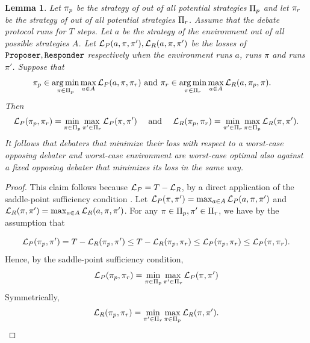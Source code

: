 \documentclass[11pt,letterpaper]{article}
\newtheorem{lemma}[theorem]{Lemma}
\theoremstyle{definition}
\theoremstyle{plain}
\DeclareMathOperator*{\argmin}{arg\,min}
\begin{document}
\begin{lemma}\label{lem:equilibrium}
    Let $\pi_{p}$ be the strategy of \dt out of all potential strategies $\Pi_{p}$ and let $\pi_{r}$ be the strategy of \df out of all potential strategies $\Pi_{r}$. Assume that the debate protocol runs for $T$ steps. Let $a$ be the strategy of the environment out of all possible strategies $A$. 
    Let ${{\mathcal L}_P}(a, \pi,\pi'), {{\mathcal L}_R}(a,\pi,\pi')$ be the losses of $\texttt{Proposer},\texttt{Responder}$ respectively when the environment runs $a$, \dt runs $\pi$ and \df runs $\pi'$. 
    Suppose that 
    \begin{align*}
            &\pi_\ct \in \argmin_{\pi \in \Pi_\ct} \max_{a \in A} \tLo(a,\pi,\pi_\cf)\text{     and }
    \pi_\cf \in \argmin_{\pi \in \Pi_\cf} \max_{a \in A} \fLo(a,\pi_\ct,\pi).
    \end{align*}
    Then 
    \[
   {{\mathcal L}_P}(\pi_{p}, \pi_{r})
    = \min_{\pi \in \Pi_{p}}\max_{\pi'\in \Pi_{r}}{{\mathcal L}_P}(\pi,\pi')
\quad \text{ and }\quad
{{\mathcal L}_R}(\pi_{p}, \pi_{r})
 =    \min_{\pi' \in \Pi_{r}}\max_{\pi\in \Pi_{p}}{{\mathcal L}_R}(\pi,\pi').
    \]
    It follows that debaters that minimize their loss with respect to a worst-case opposing debater and worst-case environment are worst-case optimal also against a fixed opposing debater that minimizes its loss in the same way. 
\end{lemma}
\begin{proof}
    This claim follows because ${{\mathcal L}_P} = T-{{\mathcal L}_R}$, by a direct application of the saddle-point 
sufficiency condition \cite[see, e.g.,][]{boyd2004convex}. Let ${{\mathcal L}_P}(\pi,\pi') = \max_{a \in A} {{\mathcal L}_P}(a,\pi,\pi')$ and ${{\mathcal L}_R}(\pi,\pi') = \max_{a \in A} {{\mathcal L}_R}(a,\pi,\pi')$. For any $\pi \in \Pi_{p},\pi' \in \Pi_{r}$, we have by the assumption that 

\[
{{\mathcal L}_P}(\pi_{p}, \pi') =
    T - {{\mathcal L}_R}(\pi_{p}, \pi')
    \leq 
    T - {{\mathcal L}_R}(\pi_{p}, \pi_{r})
    \leq {{\mathcal L}_P}(\pi_{p}, \pi_{r})
    \leq {{\mathcal L}_P}(\pi, \pi_{r}).
\]
Hence, by the saddle-point 
sufficiency condition,
\[
   {{\mathcal L}_P}(\pi_{p}, \pi_{r})
    = \min_{\pi \in \Pi_{p}}\max_{\pi'\in \Pi_{r}}{{\mathcal L}_P}(\pi,\pi')
\]
Symmetrically,
\[
{{\mathcal L}_R}(\pi_{p}, \pi_{r})
 =    \min_{\pi' \in \Pi_{r}}\max_{\pi\in \Pi_{p}}{{\mathcal L}_R}(\pi,\pi').
    \]
\end{proof}
\end{document}
